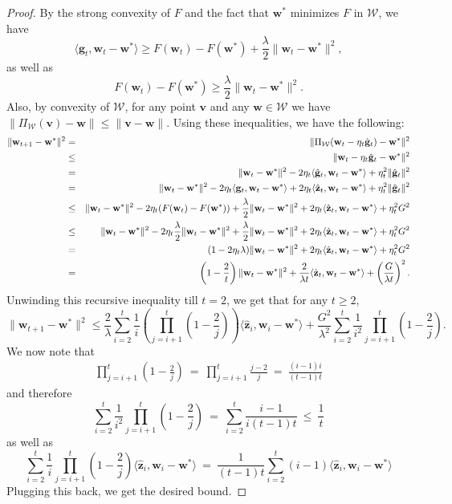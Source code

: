 \documentclass{article}
\newcommand{\bw}{\mathbf{w}}
\newcommand{\bv}{\mathbf{v}}
\newcommand{\bz}{\mathbf{z}}
\newcommand{\bg}{\mathbf{g}}
\newcommand{\Wcal}{\mathcal{W}}
\newcommand{\norm}[1]{\|#1\|}
\newcommand{\inner}[1]{\langle#1\rangle}
\begin{document}
\begin{proof}
By the strong convexity of $F$ and the fact that $\bw^*$ minimizes $F$ in $\Wcal$, we have
\[
\inner{\bg_t,\bw_t-\bw^{*}} \geq F(\bw_t)-F(\bw^{*})+\frac{\lambda}{2}\norm{\bw_t-\bw^{*}}^2,
\]
as well as
\[
F(\bw_t)-F(\bw^*) \geq \frac{\lambda}{2}\norm{\bw_t-\bw^{*}}^2.
\]
Also, by convexity of $\Wcal$, for any point $\bv$ and any $\bw\in \Wcal$ we have $\norm{\Pi_{\Wcal}(\bv)-\bw}\leq \norm{\bv-\bw}$. Using these inequalities, we have the following:
\begin{eqnarray}
    \norm{\bw_{t+1}-\bw^{*}}^2 &=& \norm{\Pi_{\Wcal}(\bw_{t}-\eta_t \hat{\bg}_t)-\bw^{*}}^2\notag\\
    &\leq& \norm{\bw_{t}-\eta_t \hat{\bg}_t-\bw^{*}}^2\notag\\
    &=& \norm{\bw_t-\bw^{*}}^2-2\eta_t \inner{\hat{\bg}_t,\bw_t-\bw^{*}}
    +\eta_t^2\norm{\hat{\bg}_t}^2\notag\\
    &=& \norm{\bw_t-\bw^{*}}^2-2\eta_t \inner{\bg_t,\bw_t-\bw^{*}}+2\eta_t\inner{\hat{\bz}_t,\bw_t-\bw^{*}}
    +\eta_t^2\norm{\hat{\bg}_t}^2\notag\\
    &\leq& \norm{\bw_t-\bw^{*}}^2-2\eta_t (F(\bw_t)-F(\bw^{*}))+\frac{\lambda}{2}\norm{\bw_t-\bw^{*}}^2
    +2\eta_t\inner{\hat{\bz}_t,\bw_t-\bw^{*}}+\eta_t^2 G^2\notag\\
    &\leq& \norm{\bw_t-\bw^{*}}^2-2\eta_t \frac{\lambda}{2}\norm{\bw_t-\bw^{*}}^2+\frac{\lambda}{2}\norm{\bw_t-\bw^{*}}^2
    +2\eta_t\inner{\hat{\bz}_t,\bw_t-\bw^{*}}+\eta_t^2 G^2\notag\\
    &=& (1-2\eta_t \lambda)\norm{\bw_t-\bw^{*}}^2+2\eta_t\inner{\hat{\bz}_t,\bw_t-\bw^{*}}+\eta_t^2 G^2\notag\\
    &=& \left(1-\frac{2}{t}\right)\norm{\bw_t-\bw^{*}}^2+\frac{2}{\lambda t}\inner{\hat{\bz}_t,\bw_t-\bw^{*}}+\left(\frac{G}{\lambda t}\right)^2.\label{eq:development}
\end{eqnarray}
Unwinding this recursive inequality till $t=2$, we get that for any $t\geq 2$,
\[
\norm{\bw_{t+1}-\bw^*}^2 \leq \frac{2}{\lambda}\sum_{i= 2 }^{t}\frac{1}{i}\left(\prod_{j=i+1}^{t}\left(1-\frac{2}{j}\right)\right)
\inner{\hat{\bz}_i,\bw_i-\bw^*}+\frac{G^2}{\lambda^2}\sum_{i= 2 }^{t}\frac{1}{i^2}\prod_{j=i+1}^{t}\left(1-\frac{2}{j}\right).
\]
We now note that
\begin{align*}
\prod_{j=i+1}^{t}\left(1-\frac{2}{j}\right)~=~
\prod_{j=i+1}^{t}\frac{j-2}{j}
~=~
\frac{(i-1)i}{(t-1)t}
\end{align*}
and therefore
\[
\sum_{i= 2 }^{t}\frac{1}{i^2}\prod_{j=i+1}^{t}\left(1-\frac{2}{j}\right)
~=~
\sum_{i= 2 }^{t}\frac{i-1}{i(t-1)t} ~\leq~ \frac{1}{t}
\]
as well as
\[
\sum_{i= 2 }^{t}\frac{1}{i}\prod_{j=i+1}^{t}\left(1-\frac{2}{j}\right)\inner{\hat{\bz}_i,\bw_i-\bw^*}
~=~
\frac{1}{(t-1)t}\sum_{i= 2 }^{t}(i-1)\inner{\hat{\bz}_i,\bw_i-\bw^*}
\]
Plugging this back, we get the desired bound.
\end{proof}
\end{document}
